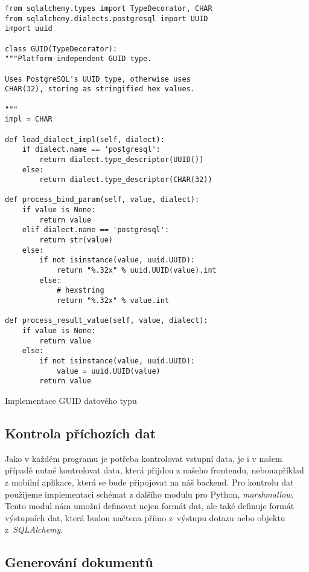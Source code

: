 \begin{listing}[H]
    \begin{verbatim}
from sqlalchemy.types import TypeDecorator, CHAR
from sqlalchemy.dialects.postgresql import UUID
import uuid

class GUID(TypeDecorator):
"""Platform-independent GUID type.

Uses PostgreSQL's UUID type, otherwise uses
CHAR(32), storing as stringified hex values.

"""
impl = CHAR

def load_dialect_impl(self, dialect):
    if dialect.name == 'postgresql':
        return dialect.type_descriptor(UUID())
    else:
        return dialect.type_descriptor(CHAR(32))

def process_bind_param(self, value, dialect):
    if value is None:
        return value
    elif dialect.name == 'postgresql':
        return str(value)
    else:
        if not isinstance(value, uuid.UUID):
            return "%.32x" % uuid.UUID(value).int
        else:
            # hexstring
            return "%.32x" % value.int

def process_result_value(self, value, dialect):
    if value is None:
        return value
    else:
        if not isinstance(value, uuid.UUID):
            value = uuid.UUID(value)
        return value
    \end{verbatim}
    \caption{Implementace GUID datového typu}
    \label{lst:guidImplementation}
\end{listing}

\subsection{Kontrola příchozích dat}

Jako v každém programu je potřeba kontrolovat vstupní data, je i v našem případě nutné kontrolovat data, která přijdou z našeho frontendu, nebo\linebreak například z mobilní aplikace,
která se bude připojovat na náš backend. Pro kontrolu dat použijeme implementaci schémat z dalšího modulu pro Python, \textit{marshmallow}. Tento modul nám umožní definovat
nejen formát dat, ale také definuje formát výstupních dat, která budou načtena přímo z~výstupu dotazu nebo objektu z~\textit{SQLAlchemy}.

\subsection{Generování dokumentů}

